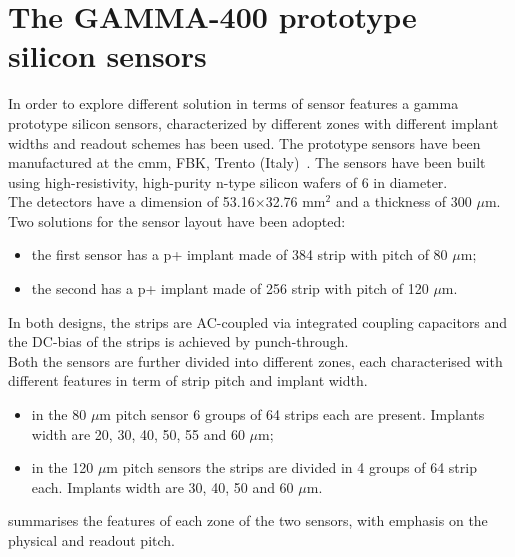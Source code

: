 \section{The GAMMA-400 prototype silicon sensors}
In order to explore different solution in terms of sensor features a \gls{gamma}
prototype silicon sensors, characterized by different zones with different
implant widths and readout schemes has been used. The prototype sensors have
been manufactured at the \gls{cmm}, FBK, Trento (Italy)~\cite{cmm-fbk}. The sensors have
been built using high-resistivity, high-purity n-type silicon wafers of 6
in diameter.\\
The detectors have a dimension of 53.16$\times$32.76 mm$^2$ and a
thickness of 300 $\mu$m. Two solutions for the sensor layout have been
adopted:
\begin{itemize}
\item the first sensor has a p+ implant made of 384 strip with pitch of 80
  $\mu$m;
\item the second has a p+ implant made of 256 strip with pitch of 120
  $\mu$m.
\end{itemize}
In both designs, the strips are AC-coupled via integrated coupling capacitors
and the DC-bias of the strips is achieved by punch-through.\\
Both the sensors are further divided into different zones, each characterised
with different features in term of strip pitch and implant width.
\begin{itemize}
\item in the 80 $\mu$m pitch sensor 6 groups of 64 strips each are
  present. Implants width are 20, 30, 40, 50, 55 and 60 $\mu$m;
\item in the 120 $\mu$m pitch sensors the strips are divided in 4 groups of 64
  strip each. Implants width are 30, 40, 50 and 60 $\mu$m.
\end{itemize}
 summarises the features of each zone of the two
sensors, with emphasis on the physical and readout pitch.
